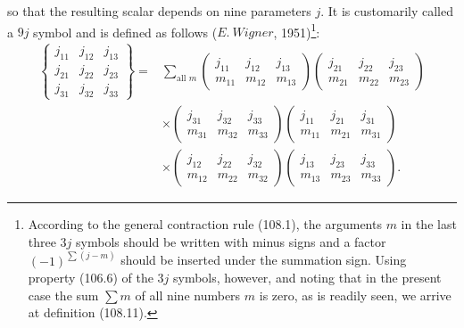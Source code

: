 so that the resulting scalar depends on nine parameters $j$. It is customarily called a $9j$ symbol and is defined as follows ($E.\ Wigner$, 1951)\footnote{According to the general contraction rule (108.1), the arguments $m$ in the last three $3j$ symbols should be written with minus signs and a factor $(-1)^{\sum(j-m)}$ should be inserted under the summation sign. Using property (106.6) of the $3j$ symbols, however, and noting that in the present case the sum $\sum m$ of all nine numbers $m$ is zero, as is readily seen, we arrive at definition (108.11).}:
\begin{equation}
\begin{aligned}
\left\{\begin{matrix}j_{11}&j_{12}&j_{13}\\j_{21}&j_{22}&j_{23}\\j_{31}&j_{32}&j_{33}\end{matrix}\right\}
={}&\sum_{\text{all }m}
\begin{pmatrix}j_{11}&j_{12}&j_{13}\\m_{11}&m_{12}&m_{13}\end{pmatrix}
\begin{pmatrix}j_{21}&j_{22}&j_{23}\\m_{21}&m_{22}&m_{23}\end{pmatrix}\\
&\times\begin{pmatrix}j_{31}&j_{32}&j_{33}\\m_{31}&m_{32}&m_{33}\end{pmatrix}
\begin{pmatrix}j_{11}&j_{21}&j_{31}\\m_{11}&m_{21}&m_{31}\end{pmatrix}\\
&\times\begin{pmatrix}j_{12}&j_{22}&j_{32}\\m_{12}&m_{22}&m_{32}\end{pmatrix}
\begin{pmatrix}j_{13}&j_{23}&j_{33}\\m_{13}&m_{23}&m_{33}\end{pmatrix}.
\end{aligned}
\tag{108.11}
\end{equation}

